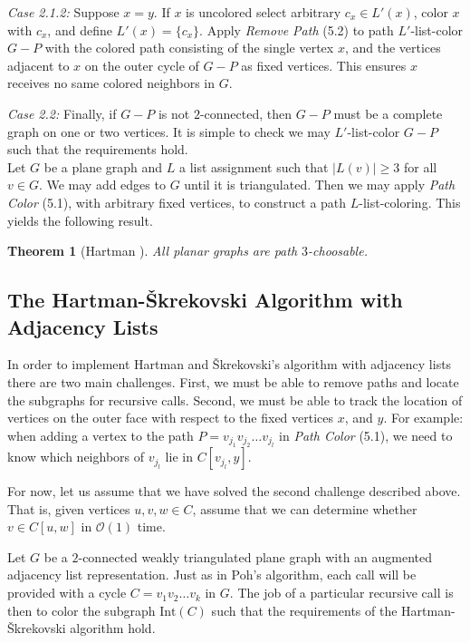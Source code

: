 \documentclass[letterpaper, 12pt]{article}
\theoremstyle{thm}
\newtheorem{theorem}{Theorem}[section]
\begin{document}
\textit{Case 2.1.2:} Suppose $x=y$. If $x$ is uncolored select arbitrary
$c_x\in L'(x)$, color $x$ with $c_x$, and define $L'(x)=\{c_x\}$. Apply
\textit{Remove Path} (5.2) to path $L'$-list-color $G-P$
with the colored path consisting of the single vertex $x$, and the vertices
adjacent to $x$ on the outer cycle of $G-P$ as fixed vertices. This ensures $x$
receives no same colored neighbors in $G$.

\textit{Case 2.2:} Finally, if $G-P$ is not $2$-connected, then $G-P$ must be a
complete graph on one or two vertices. It is simple to check we may
$L'$-list-color $G-P$ such that the requirements hold.\\

Let $G$ be a plane graph and $L$ a list assignment such that $\big|L(v)\big|\ge 3$
for all $v\in G$. We may add edges to $G$ until it is triangulated. Then
we may apply \textit{Path Color} (5.1), with arbitrary fixed vertices, to
construct a path $L$-list-coloring. This yields the following result.

\begin{theorem}[Hartman \cite{hartman}]
All planar graphs are path $3$-choosable.
\end{theorem}

\subsection{The Hartman-\v{S}krekovski Algorithm with Adjacency Lists}

In order to implement Hartman and \v{S}krekovski's algorithm with adjacency lists
there are two main challenges. First, we must be able to remove paths and
locate the subgraphs for recursive calls. Second, we must be able to track the
location of vertices on the outer face with respect to the fixed vertices
$x$, and $y$. For example: when adding a vertex to the path
$P=v_{j_1}v_{j_2}\ldots v_{j_l}$ in \textit{Path Color} (5.1), we need to know
which neighbors of $v_{j_l}$ lie in $C[v_{j_l},y]$.

For now, let us assume that we have solved the second challenge described above. That
is, given vertices $u,v,w\in C$, assume that we can determine whether $v\in C[u,w]$
in $\mathcal{O}(1)$ time.

Let $G$ be a $2$-connected weakly triangulated plane graph with an augmented
adjacency list representation. Just as in Poh's algorithm, each call will be
provided with a cycle $C=v_1v_2\ldots v_k$ in $G$. The
job of a particular recursive call is then to color the subgraph $\text{Int}(C)$
such that the requirements of the Hartman-\v{S}krekovski algorithm hold.
\end{document}
